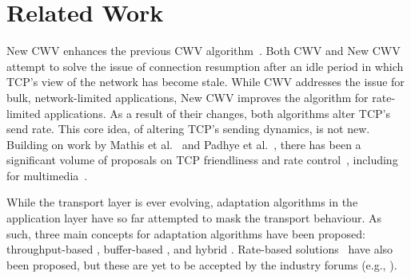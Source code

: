 \documentclass[10pt,sigconf,anonymous]{acmart}
\begin{document}
\section{Related Work}
\label{sec:related}

New CWV enhances the previous CWV algorithm~\cite{rfc2861-2000-padhye-congestion-window-validation}. Both CWV and New CWV attempt to solve the issue of connection resumption after an idle period in which TCP's view of the network has become stale. While CWV addresses the issue for bulk, network-limited applications, New CWV improves the algorithm for rate-limited applications. As a result of their changes, both algorithms alter TCP's send rate. This core idea, of altering TCP's sending dynamics, is not new. Building on work by Mathis et al.~\cite{Mathis-1997-the-macroscopic-behavior-tcp} and Padhye et al.~\cite{Padhye-1998-modelling-tcp-throughput}, there has been a significant volume of proposals on TCP friendliness and rate control~\cite{rfc-5348-tfrc,Rossi-2010-ledbat,Arun-2018-copa}, including for multimedia~\cite{Carlucci-2016-Analysis-WebRTC,Choi-2007-fairer-tfrc}.

While the transport layer is ever evolving, adaptation algorithms in the application layer have so far attempted to mask the transport behaviour. As such, three main concepts for adaptation algorithms have been proposed: throughput-based \cite{Sun-2016-cs2p, Jiang-2012-improving-fairness-http-video-festive}, buffer-based \cite{Spiteri-2016-BOLA,Huang-2015-A-buffer-based-approach-to-rate-adaptation-bba}, and hybrid \cite{Spiteri-2019-from-theory-to-practice-sabre,Wang-2016-squad}. Rate-based solutions~\cite{Li-2014-probe-and-adapt-panda,Liu-2011-rate-adaptation} have also been proposed, but these are yet to be accepted by the industry forums (e.g., \cite{online-dashif}).

\end{document}
